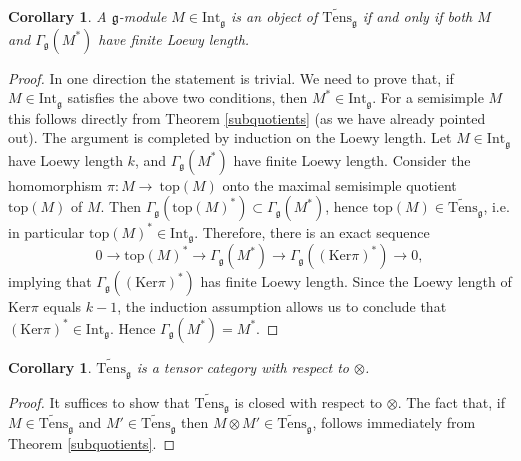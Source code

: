\documentclass{birkmult}
\newcounter{theorem}
\newtheorem{corollary}[theo]{Corollary}
\newcommand {\Top} {\mathrm{top}}
\newcommand {\Ker} {\mathrm{Ker}}
\renewcommand{\gg}{\mathfrak{g}}
\newcommand{\Int}{\mathrm{Int}}
\newcommand{\lind}{\widetilde{\mathrm{Tens}}}
\begin{document}
\begin{corollary}\label{agmod}
A $\gg$-module $M\in\Int_\gg$ is an object of $\lind_\gg$ if and only if both
$M$ and $\Gamma_\gg(M^*)$ have finite Loewy length.
\end{corollary}
\begin{proof}
In one direction the statement is trivial. We need to prove that, 
if $M\in\Int_\gg$ satisfies the above two conditions, then $M^*\in\Int_\gg$.
For a semisimple $M$ this follows directly from Theorem \ref{subquotients} (as we have already
pointed out). The argument is completed by induction on the Loewy length. Let $M \in\Int_\gg$
have Loewy length $k$, and $\Gamma_\gg(M^*)$ have finite Loewy length.
Consider the homomorphism $\pi:M \rightarrow \ \Top(M)$ onto the maximal semisimple
quotient $\Top(M)$ of $M$. Then $\Gamma_\gg(\Top(M)^*)\subset\Gamma_\gg(M^*)$, hence
$\Top(M)\in\lind_\gg$, i.e. in particular $\Top(M)^*\in\Int_\gg$. Therefore, there is an exact 
sequence $$0 \rightarrow \Top(M)^* \rightarrow\Gamma_\gg(M^*)\rightarrow\Gamma_\gg((\Ker\pi)^*)
\rightarrow 0,$$
implying that $\Gamma_\gg((\Ker\pi)^*)$ has finite Loewy length. Since the Loewy length
of $\Ker\pi$ equals $k-1$, the induction assumption allows us to conclude that $(\Ker\pi)^* \in\Int_\gg$. Hence
$\Gamma_\gg(M^*)=M^*$.
\end{proof}
\begin{corollary}
$\lind_\gg$ is a tensor category with respect to $\otimes$.
\end{corollary}
\begin{proof}
It suffices to show that $\lind_\gg$ is closed with respect to $\otimes$.
The fact that, if $M\in\lind_\gg$ and $M'\in\lind_\gg$ then $M\otimes M'\in\lind_\gg$,
follows immediately from Theorem \ref{subquotients}.
\end{proof}
\end{document}
